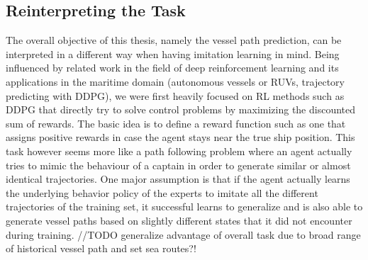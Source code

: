 \subsection{Reinterpreting the Task} \label{subchap:reinterpreting}
The overall objective of this thesis, namely the vessel path prediction, can be interpreted in a different way when having imitation learning in mind. Being influenced by related work in the field of deep reinforcement learning and its applications in the maritime domain (autonomous vessels or RUVs, trajectory predicting with DDPG), we were first heavily focused on RL methods such as DDPG that directly try to solve control problems by maximizing the discounted sum of rewards. The basic idea is to define a reward function such as one that assigns positive rewards in case the agent stays near the true ship position. This task however seems more like a path following problem where an agent actually tries to mimic the behaviour of a captain in order to generate similar or almost identical trajectories. One major assumption is that if the agent actually learns the underlying behavior policy of the experts to imitate all the different trajectories of the training set, it successful learns to generalize and is also able to generate vessel paths based on slightly different states that it did not encounter during training.
//TODO generalize advantage of overall task due to broad range of historical vessel path and set sea routes?!